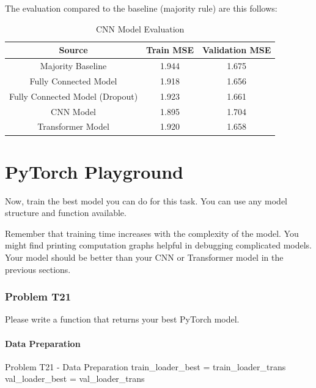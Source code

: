 \documentclass[12pt, a4paper]{article}
\begin{document}
            \noindent The evaluation compared to the baseline (majority rule) are this follows:
            \begin{table}[h]
                \centering
                \begin{tabular}{|c|c|c|}
                    \hline
                    \textbf{Source} & \textbf{Train MSE} & \textbf{Validation MSE} \\
                    \hline \hline
                    Majority Baseline & 1.944 & 1.675 \\
                    Fully Connected Model & 1.918 & 1.656 \\
                    Fully Connected Model (Dropout) & 1.923 & 1.661 \\
                    CNN Model & 1.895 & 1.704 \\
                    Transformer Model & 1.920 & 1.658 \\
                    \hline
                \end{tabular}
                \caption{CNN Model Evaluation}
            \end{table}

    \pagebreak

    \part{PyTorch Playground}
        Now, train the best model you can do for this task.
        You can use any model structure and function available.
    
        \vspace{0.5em}

        Remember that training time increases with the complexity of the model.
        You might find printing computation graphs helpful in debugging complicated models.
        Your model should be better than your CNN or Transformer model in the previous sections.

        \section{Problem T21}
            Please write a function that returns your best PyTorch model.
            
            \subsection{Data Preparation}
                \begin{codeblock}{Problem T21 - Data Preparation}
                    train_loader_best = train_loader_trans
                    val_loader_best = val_loader_trans
                \end{codeblock}
\end{document}
